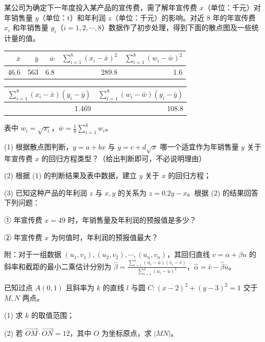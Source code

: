 \begin{question}
某公司为确定下一年度投入某产品的宣传费，需了解年宣传费 $x$（单位：千元）对年销售量 $y$（单位：t）和年利润 $z$（单位：千元）的影响。对近 8 年的年宣传费 $x_i$ 和年销售量 $y_i$（$i=1,2,\cdots,8$）数据作了初步处理，得到下面的散点图及一些统计量的值。
\nopagebreak[4]
\begin{center}\end{center}
\nopagebreak[4]
\begin{center}
\begin{tabular}{rrrrr}
\toprule
$\bar x$ & $\bar y$ & $\bar w$ & $\sum_{i=1}^{8}(x_i-\bar x)^2$ & $\sum_{i=1}^{8}(w_i-\bar w)^2$ \\
\midrule
46.6 & 563 & 6.8 & 289.8 & 1.6 \\
\bottomrule
\end{tabular}
\end{center}

\begin{center}
\begin{tabular}{rr}
\toprule
$\sum_{i=1}^{8}(x_i-\bar x)(y_i-\bar y)$ & $\sum_{i=1}^{8}(w_i-\bar w)(y_i-\bar y)$ \\
\midrule
1.469 & 108.8 \\
\bottomrule
\end{tabular}
\end{center}

表中 $w_i=\sqrt{x_i}$，$\bar w=\frac18\sum_{i=1}^{8}w_i$。

(1) 根据散点图判断，$y=a+bx$ 与 $y=c+d\sqrt x$ 哪一个适宜作为年销售量 $y$ 关于年宣传费 $x$ 的回归方程类型？（给出判断即可，不必说明理由）

(2) 根据 (1) 的判断结果及表中数据，建立 $y$ 关于 $x$ 的回归方程；

(3) 已知这种产品的年利润 $z$ 与 $x,y$ 的关系为 $z=0.2y-x$。根据 (2) 的结果回答下列问题：

① 年宣传费 $x=49$ 时，年销售量及年利润的预报值是多少？

② 年宣传费 $x$ 为何值时，年利润的预报值最大？

附：对于一组数据 $(u_1,v_1),(u_2,v_2),\cdots,(u_n,v_n)$，其回归直线 $v=\alpha+\beta u$ 的斜率和截距的最小二乘估计分别为 $\hat\beta=\frac{\sum_{i=1}^{n}(u_i-\bar u)(v_i-\bar v)}{\sum_{i=1}^{n}(u_i-\bar u)^2}$，$\hat\alpha=\bar v-\hat\beta\bar u$。

\end{question}
\begin{question}
已知过点 $A(0,1)$ 且斜率为 $k$ 的直线 $l$ 与圆 $C:(x-2)^2+(y-3)^2=1$ 交于 $M,N$ 两点。

(1) 求 $k$ 的取值范围；

(2) 若 $\overrightarrow{OM}\cdot\overrightarrow{ON}=12$，其中 $O$ 为坐标原点，求 $|MN|$。

\end{question}
